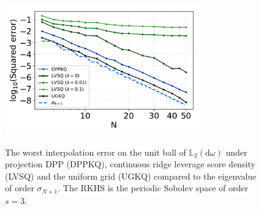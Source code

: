 \documentclass[twoside,11pt]{book}
\numberwithin{theorem}{chapter}
\numberwithin{definition}{chapter}
\numberwithin{proposition}{chapter}
\numberwithin{corollary}{chapter}
\numberwithin{example}{chapter}
\numberwithin{lemma}{chapter}
\numberwithin{assumption}{chapter}
\numberwithin{equation}{chapter}
\numberwithin{figure}{chapter}
\begin{document}
\begin{figure}
\centering
\includegraphics[width=0.75\textwidth]{img/neurips/Sobolev/suponunitball_interpolation_pSobolev_s_3_randomvectors_2000_fig_1.pdf}\\
\caption{The worst interpolation error on the unit ball of $\mathbb{L}_{2}(\mathrm{d}\omega)$ under projection DPP (DPPKQ), continuous ridge leverage score density (LVSQ) and the uniform grid (UGKQ) compared to the eigenvalue of order $\sigma_{N+1}$. The RKHS is the periodic Sobolev space of order $s=3$.
\label{fig:introduction_pDPP_results_pSobolev_exp_2}}
\end{figure}



\end{document}
